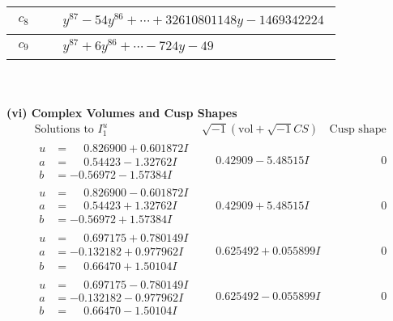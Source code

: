 \documentclass[1p]{elsarticle_modified}
\theoremstyle{definition}
\newcommand{\I}{\sqrt{-1}}
\begin{document}
\begin{tabular}{m{50pt}|m{274pt}}
\hline $$\begin{aligned}c_{8}\end{aligned}$$&$\begin{aligned}
&y^{87}-54 y^{86}+\cdots+32610801148 y-1469342224
\end{aligned}$\\
\hline $$\begin{aligned}c_{9}\end{aligned}$$&$\begin{aligned}
&y^{87}+6 y^{86}+\cdots-724 y-49
\end{aligned}$\\
\hline
\end{tabular}\\~\\
\newpage\flushleft \textbf{(vi) Complex Volumes and Cusp Shapes}
$$\begin{array}{c|c|c}  
\text{Solutions to }I^u_{1}& \I (\text{vol} + \sqrt{-1}CS) & \text{Cusp shape}\\
 \hline 
\begin{aligned}
u &= \phantom{-}0.826900 + 0.601872 I \\
a &= \phantom{-}0.54423 - 1.32762 I \\
b &= -0.56972 - 1.57384 I\end{aligned}
 & \phantom{-}0.42909 - 5.48515 I & \phantom{-0.000000 } 0 \\ \hline\begin{aligned}
u &= \phantom{-}0.826900 - 0.601872 I \\
a &= \phantom{-}0.54423 + 1.32762 I \\
b &= -0.56972 + 1.57384 I\end{aligned}
 & \phantom{-}0.42909 + 5.48515 I & \phantom{-0.000000 } 0 \\ \hline\begin{aligned}
u &= \phantom{-}0.697175 + 0.780149 I \\
a &= -0.132182 + 0.977962 I \\
b &= \phantom{-}0.66470 + 1.50104 I\end{aligned}
 & \phantom{-}0.625492 + 0.055899 I & \phantom{-0.000000 } 0 \\ \hline\begin{aligned}
u &= \phantom{-}0.697175 - 0.780149 I \\
a &= -0.132182 - 0.977962 I \\
b &= \phantom{-}0.66470 - 1.50104 I\end{aligned}
 & \phantom{-}0.625492 - 0.055899 I & \phantom{-0.000000 } 0 \\ \hline\begin{aligned}

\end{aligned}
\end{array}$$
\end{document}
